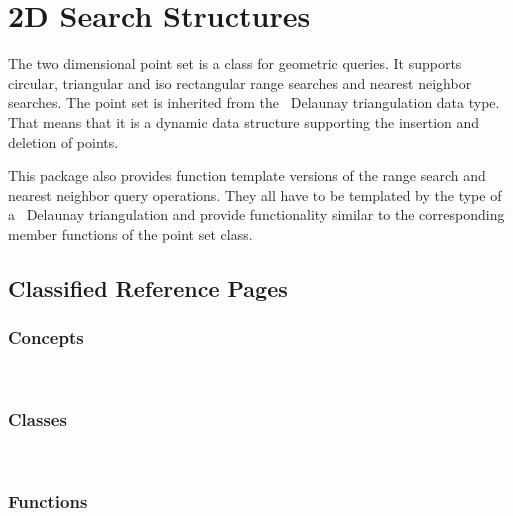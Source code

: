 

\ccParDims


\chapter{2D Search Structures}



The two dimensional point set is a class for geometric queries.
It supports circular, triangular and iso rectangular range searches and
nearest neighbor searches.
The point set is inherited from the \cgal\ Delaunay triangulation data type.
That means that it is a dynamic data structure supporting the insertion and
deletion of points. 

This package also provides function template versions of the range search and nearest
neighbor query operations. They all have to be templated by the type of a \cgal\
Delaunay triangulation and provide functionality similar to the corresponding
member functions of the point set class.



\section{Classified Reference Pages}

\subsection*{Concepts}
\\

\subsection*{Classes}
\\

\subsection*{Functions}
\\
\\


